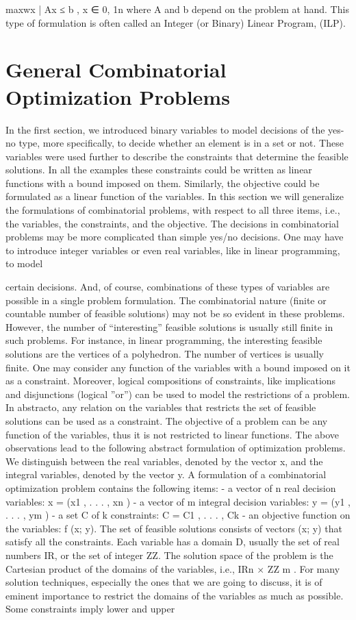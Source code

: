 \documentclass[titlepage]{book}
\begin{document}
max{wx | Ax ≤ b , x ∈ {0, 1}n }
where A and b depend on the problem at hand. This type of formulation is often called an Integer (or
Binary) Linear Program, (ILP).

\section{General Combinatorial Optimization Problems}

In the first section, we introduced binary variables to model decisions of the yes-no type, more specifically,
to decide whether an element is in a set or not. These variables were used further to describe the
constraints that determine the feasible solutions. In all the examples these constraints could be written
as linear functions with a bound imposed on them. Similarly, the objective could be formulated as a linear
function of the variables. In this section we will generalize the formulations of combinatorial problems,
with respect to all three items, i.e., the variables, the constraints, and the objective.
The decisions in combinatorial problems may be more complicated than simple yes/no decisions. One
may have to introduce integer variables or even real variables, like in linear programming, to model

certain decisions. And, of course, combinations of these types of variables are possible in a single problem
formulation. The combinatorial nature (finite or countable number of feasible solutions) may not be so
evident in these problems. However, the number of “interesting” feasible solutions is usually still finite
in such problems. For instance, in linear programming, the interesting feasible solutions are the vertices
of a polyhedron. The number of vertices is usually finite.
One may consider any function of the variables with a bound imposed on it as a constraint. Moreover,
logical compositions of constraints, like implications and disjunctions (logical ”or”) can be used to model
the restrictions of a problem. In abstracto, any relation on the variables that restricts the set of feasible
solutions can be used as a constraint.
The objective of a problem can be any function of the variables, thus it is not restricted to linear functions.
The above observations lead to the following abstract formulation of optimization problems. We distinguish between the real variables, denoted by the vector x, and the integral variables, denoted by the
vector y. A formulation of a combinatorial optimization problem contains the following items:
- a vector of n real decision variables:
x = (x1 , . . . , xn )
- a vector of m integral decision variables:
y = (y1 , . . . , ym )
- a set C of k constraints:
C = {C1 , . . . , Ck }
- an objective function on the variables:
f (x; y).
The set of feasible solutions consists of vectors (x; y) that satisfy all the constraints. Each variable has a
domain D, usually the set of real numbers IR, or the set of integer ZZ. The solution space of the problem
is the Cartesian product of the domains of the variables, i.e., IRn × ZZ m .
For many solution techniques, especially the ones that we are going to discuss, it is of eminent importance
to restrict the domains of the variables as much as possible. Some constraints imply lower and upper
\end{document}
